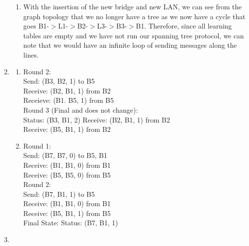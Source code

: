 \documentclass[10pt]{article}
\begin{document}
\begin{enumerate}
\begin{enumerate}
        \item With the insertion of the new bridge and new LAN, we can see from the graph topology that we no longer have a tree as we now have a cycle that goes B1-$>$L1-$>$B2-$>$L3-$>$B3-$>$B1. Therefore, since all learning tables are empty and we have not run our spanning tree protocol, we can note that we would have an infinite loop of sending messages along the lines.
       \end{enumerate}
       \item \begin{enumerate}
        \item Round 2:\\
            Send: (B3, B2, 1) to B5\\
            Receive: (B2, B1, 1) from B2\\
            Receieve: (B1. B5, 1) from B5\\
            Round 3 (Final and does not change):\\
            Status: (B3, B1, 2)
            Receive: (B2, B1, 1) from B2\\
            Receive: (B5, B1, 1) from B2
        \item Round 1:\\
            Send: (B7, B7, 0) to B5, B1\\
            Receive: (B1, B1, 0) from B1\\
            Receive: (B5, B5, 0) from B5\\
            Round 2:\\
            Send: (B7, B1, 1) to B5\\
            Receive: (B1, B1, 0) from B1\\
            Receive: (B5, B1, 1) from B5\\
            Final State:
            Status: (B7, B1, 1)
       \end{enumerate}
       \item\begin{enumerate}

\end{enumerate}
\end{enumerate}
\end{document}
